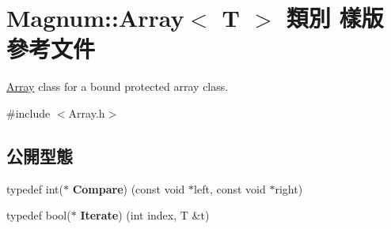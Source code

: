 \hypertarget{class_magnum_1_1_array}{}\section{Magnum\+:\+:Array$<$ T $>$ 類別 樣版 參考文件}
\label{class_magnum_1_1_array}


\hyperlink{class_magnum_1_1_array}{Array} class for a bound protected array class.  




{\ttfamily \#include $<$Array.\+h$>$}

\subsection*{公開型態}
\begin{DoxyCompactItemize}
\item 
typedef int($\ast$ {\bfseries Compare}) (const void $\ast$left, const void $\ast$right)\hypertarget{class_magnum_1_1_array_adc7d00263d5d82f7cb926a4c20786208}{}\label{class_magnum_1_1_array_adc7d00263d5d82f7cb926a4c20786208}

\item 
typedef bool($\ast$ {\bfseries Iterate}) (int index, T \&t)\hypertarget{class_magnum_1_1_array_a5ea93cd04e5948a80e5af64d6e0e4f8b}{}\label{class_magnum_1_1_array_a5ea93cd04e5948a80e5af64d6e0e4f8b}

\end{DoxyCompactItemize}
